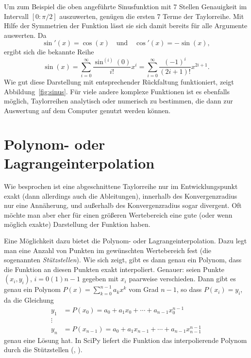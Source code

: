 Um  zum  Beispiel die  oben  angeführte  Sinusfunktion  mit 7  Stellen
Genauigkeit im Intervall $[0:\pi/2]$  auszuwerten, genügen die ersten 7
Terme der Taylorreihe. Mit Hilfe der Symmetrien der Funktion lässt sie
sich damit bereits für alle Argumente auswerten. Da
\begin{equation*}
  \sin'(x) = \cos(x) \quad\text{und} \quad \cos'(x) = -\sin(x),
\end{equation*}
ergibt sich die bekannte Reihe
\begin{equation}
  \sin(x) = \sum_{i=0}^\infty \frac{\sin^{(i)}(0)}{i!} x^i =
  \sum_{i=0}^\infty \frac{(-1)^i}{(2i+1)!} x^{2i+1}.
\end{equation}
Wie gut diese Darstellung mit entsprechender Rückfaltung funktioniert,
zeigt Abbildung~\ref{fig:sinus}.  Für viele andere komplexe Funktionen
ist es ebenfalls möglich, Taylorreihen analytisch oder numerisch zu
bestimmen, die dann zur Auswertung auf dem Computer genutzt werden
können.

\section{Polynom- oder Lagrangeinterpolation}

Wie besprochen ist eine abgeschnittene Taylorreihe nur im
Entwicklungspunkt exakt (dann allerdings auch die Ableitungen),
innerhalb des Konvergenzradius nur eine Annäherung, und außerhalb des
Konvergenzradius sogar divergent.  Oft möchte man aber eher für einen
größeren Wertebereich eine gute (oder wenn möglich exakte) Darstellung
der Funktion haben.

Eine Möglichkeit dazu bietet die Polynom- oder
Lagrangeinterpolation. Dazu legt man eine Anzahl von Punkten im
gewünschten Wertebereich fest (die sogenannten \emph{Stützstellen}).
Wie sich zeigt, gibt es dann genau ein Polynom, dass die Funktion an
diesen Punkten exakt interpoliert. Genauer: seien Punkte $(x_i, y_i)$,
$i=0(1)n-1$ gegeben mit $x_i$ paarweise verschieden. Dann gibt es
genau ein Polynom $P(x)=\sum_{k=0}^{n-1} a_kx^{k}$ vom Grad $n-1$, so
dass $P(x_i) = y_i$, da die Gleichung
\begin{equation}
  \begin{split}
    y_1 &= P(x_0) = a_0 + a_1 x_0 + \cdots + a_{n-1}x_0^{n-1}\\
    \vdots\\
    y_n &= P(x_{n-1}) = a_0 + a_1 x_{n-1} + \cdots + a_{n-1}x_{n-1}^{n-1}
  \end{split}
  \label{eq:interpol}
\end{equation}
genau eine Lösung hat.  In SciPy liefert die Funktion
 das interpolierende Polynom
durch die Stützstellen (, ).

